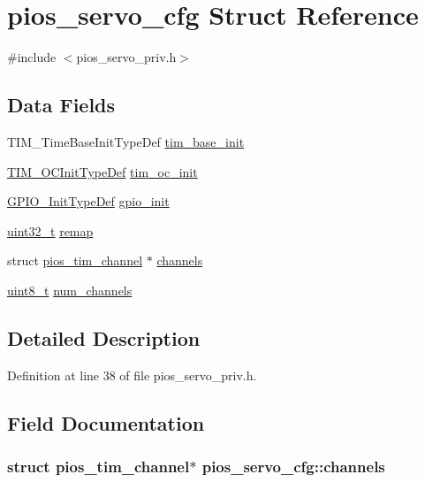 \hypertarget{structpios__servo__cfg}{\section{pios\-\_\-servo\-\_\-cfg Struct Reference}
\label{structpios__servo__cfg}
}


{\ttfamily \#include $<$pios\-\_\-servo\-\_\-priv.\-h$>$}

\subsection*{Data Fields}
\begin{DoxyCompactItemize}
\item 
T\-I\-M\-\_\-\-Time\-Base\-Init\-Type\-Def \hyperlink{structpios__servo__cfg_afd81686ed67be0c809afa058df95ad44}{tim\-\_\-base\-\_\-init}
\item 
\hyperlink{struct_t_i_m___o_c_init_type_def}{T\-I\-M\-\_\-\-O\-C\-Init\-Type\-Def} \hyperlink{structpios__servo__cfg_ac1b8636b07f30c4a459b1c09eec6356a}{tim\-\_\-oc\-\_\-init}
\item 
\hyperlink{struct_g_p_i_o___init_type_def}{G\-P\-I\-O\-\_\-\-Init\-Type\-Def} \hyperlink{structpios__servo__cfg_a41b9d93e4e94a3a0c5e40a4e42c6d117}{gpio\-\_\-init}
\item 
\hyperlink{stdint_8h_a435d1572bf3f880d55459d9805097f62}{uint32\-\_\-t} \hyperlink{structpios__servo__cfg_a01880688c4a5e40c514d26c4d64e5efe}{remap}
\item 
struct \hyperlink{structpios__tim__channel}{pios\-\_\-tim\-\_\-channel} $\ast$ \hyperlink{structpios__servo__cfg_a40751521ecd39a052006bd47079de1da}{channels}
\item 
\hyperlink{stdint_8h_aba7bc1797add20fe3efdf37ced1182c5}{uint8\-\_\-t} \hyperlink{structpios__servo__cfg_a94528872c23ad53d65dfb81ab86790fd}{num\-\_\-channels}
\end{DoxyCompactItemize}


\subsection{Detailed Description}


Definition at line 38 of file pios\-\_\-servo\-\_\-priv.\-h.



\subsection{Field Documentation}
\hypertarget{structpios__servo__cfg_a40751521ecd39a052006bd47079de1da}{
\subsubsection[{channels}]{\setlength{\rightskip}{0pt plus 5cm}struct {\bf pios\-\_\-tim\-\_\-channel}$\ast$ pios\-\_\-servo\-\_\-cfg\-::channels}}\label{structpios__servo__cfg_a40751521ecd39a052006bd47079de1da}


